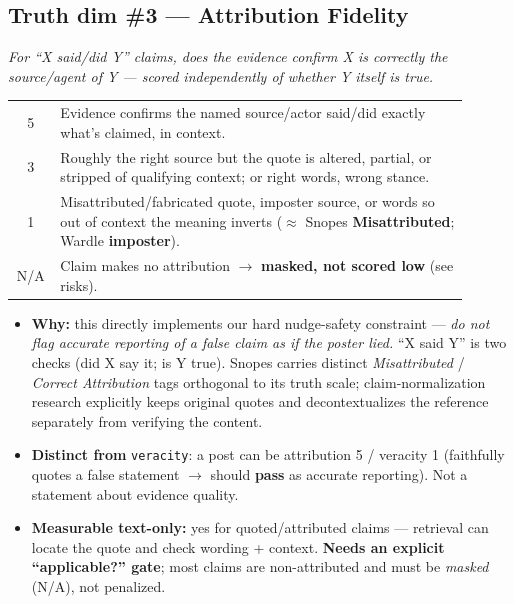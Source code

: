 \documentclass[11pt]{article}
\begin{document}
\subsection*{Truth dim \#3 --- Attribution Fidelity}
\emph{For ``X said/did Y'' claims, does the evidence confirm X is correctly the source/agent
of Y --- scored independently of whether Y itself is true.}

\begin{longtable}{@{}c>{\raggedright\arraybackslash}p{0.9\linewidth}@{}}
\toprule
5 & Evidence confirms the named source/actor said/did exactly what's claimed, in context. \\
3 & Roughly the right source but the quote is altered, partial, or stripped of qualifying
context; or right words, wrong stance. \\
1 & Misattributed/fabricated quote, imposter source, or words so out of context the meaning
inverts ($\approx$ Snopes \textbf{Misattributed}; Wardle \textbf{imposter}). \\
N/A & Claim makes no attribution $\rightarrow$ \textbf{masked, not scored low} (see risks). \\
\bottomrule
\end{longtable}

\begin{itemize}[leftmargin=1.4em]
  \item \textbf{Why:} this directly implements our hard nudge-safety constraint --- \emph{do
    not flag accurate reporting of a false claim as if the poster lied.} ``X said Y'' is two
    checks (did X say it; is Y true). Snopes carries distinct \emph{Misattributed} /
    \emph{Correct Attribution} tags orthogonal to its truth scale; claim-normalization
    research explicitly keeps original quotes and decontextualizes the reference separately
    from verifying the content.
  \item \textbf{Distinct from} \texttt{veracity}: a post can be attribution 5 / veracity 1
    (faithfully quotes a false statement $\rightarrow$ should \textbf{pass} as accurate
    reporting). Not a statement about evidence quality.
  \item \textbf{Measurable text-only:} yes for quoted/attributed claims --- retrieval can
    locate the quote and check wording + context. \textbf{Needs an explicit ``applicable?''
    gate}; most claims are non-attributed and must be \emph{masked} (N/A), not penalized.
\end{itemize}

\hrulefill
\end{document}
